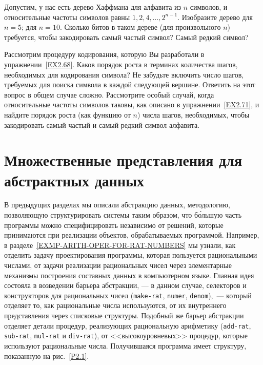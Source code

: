 \begin{exercise}{2.71}\label{EX2.71}%
Допустим, у нас есть дерево Хаффмана для алфавита из
$n$ символов, и относительные частоты символов равны
$1, 2, 4, \ldots, 2^{n-1}$.  Изобразите дерево для $n
= 5$; для $n = 10$.  Сколько битов в таком дереве
(для произвольного $n$) требуется, чтобы закодировать самый 
частый символ? Самый редкий символ?
\end{exercise}
\begin{exercise}{2.72}\label{EX2.72}%
Рассмотрим процедуру кодирования, которую Вы разработали
в упражнении~\ref{EX2.68}.  Каков порядок роста в терминах
количества шагов, необходимых для кодирования символа?  Не забудьте
включить число шагов, требуемых для поиска символа в каждой следующей
вершине.  Ответить на этот вопрос в общем случае сложно.  Рассмотрите
особый случай, когда относительные частоты символов таковы, как
описано в упражнении~\ref{EX2.71}, и найдите порядок роста
(как функцию от $n$) числа шагов, необходимых, чтобы
закодировать самый частый и самый редкий символ алфавита.
\end{exercise}


\section{Множественные представления для абстракт\-ных данных}
\label{MULTIPLE-REPRESENTATIONS-FOR-ABSTRACT-DATA}%

В предыдущих разделах мы описали абстракцию данных, методологию,
позволяющую структурировать системы таким образом, что б\'ольшую часть 
программы можно специфицировать независимо от решений, которые принимаются 
при реализации объектов, обрабатываемых программой.  Например, в 
разделе~\ref{EXMP-ARITH-OPER-FOR-RAT-NUMBERS}
мы узнали, как отделить задачу проектирования программы, которая
пользуется рациональными числами, от задачи реализации рациональных
чисел через элементарные механизмы построения составных данных в 
компьютерном языке.  Главная идея состояла в возведении барьера
абстракции, 
--- в данном случае, селекторов и конструкторов для
рациональных чисел ({\tt make-rat}, {\tt numer},
{\tt denom}),~--- который отделяет то, как рациональные числа
используются, от их внутреннего представления через списковые
структуры.  Подобный же барьер абстракции отделяет детали процедур,
реализующих рациональную арифметику ({\tt add-rat},
{\tt sub-rat}, {\tt mul-rat} и {\tt div-rat}), от
<<высокоуровневых>> процедур, которые используют рациональные числа.
Получившаяся программа имеет структуру, показанную на рис.~\ref{P2.1}.

